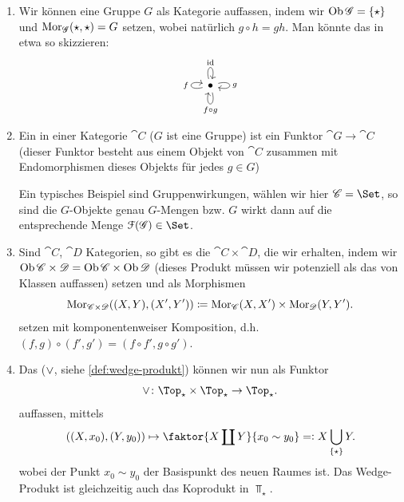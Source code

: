 \begin{example}
    \begin{enumerate}[1)]
        \item Wir können eine Gruppe $G$ als Kategorie auffassen, indem wir  $\operatorname{Ob}{\mathscr{G}} = \left \{\star\right\} $ und $\operatorname{Mor}_{\mathscr{G}}(\star,\star) = G$ setzen, wobei natürlich $g \circ  h = gh$. Man könnte das in etwa so skizzieren:
            \[
\begin{tikzcd}
            \bullet \ar[loop left]{}{f} \ar[loop above]{}{\id} \ar[loop right]{}{g} \ar[loop below]{}{f \circ g}
\end{tikzcd}
\]
\item Ein  in einer Kategorie $\cat{C}$ ($G$ ist eine Gruppe) ist ein Funktor  $\cat{G} \to  \cat{C}$ (dieser Funktor besteht aus einem Objekt von $\cat{C}$ zusammen mit Endomorphismen dieses Objekts für jedes $g\in G$)
    \begin{remark*}
        Ein typisches Beispiel sind Gruppenwirkungen, wählen wir hier $\cat{C} = \Set$, so sind die $G$-Objekte genau  $G$-Mengen bzw.  $G$ wirkt dann auf die entsprechende Menge  $\mathcal{F}(\cat{G})\in \Set$.
    \end{remark*}
\item Sind $\cat{C}$, $\cat{D}$ Kategorien, so gibt es die  $\cat{C} \times  \cat{D}$, die wir erhalten, indem wir $\operatorname{Ob}{\mathscr{C} \times \mathscr{D}} = \operatorname{Ob}{\mathscr{C}} \times \operatorname{Ob}{\mathscr{D}} $ (dieses Produkt müssen wir potenziell als das von Klassen auffassen) setzen und als Morphismen
    \[
        \operatorname{Mor}_{\mathscr{C}\times \mathscr{D}}((X,Y),(X',Y')) \coloneqq  \operatorname{Mor}_{\mathscr{C}}(X,X') \times \operatorname{Mor}_{\mathscr{D}}(Y,Y') 
    .\] 
    setzen mit komponentenweiser Komposition, d.h. $(f,g) \circ  (f', g') = (f \circ  f', g \circ  g')$.
\item Das  ($\vee$, siehe \autoref{def:wedge-produkt}) können wir nun als Funktor
     \[
    \twedge \colon \Top_{\star} \times \Top_{\star} \to  \Top_{\star}
    .\] 
    auffassen, mittels
    \[
        ((X,x_0),(Y,y_0)) \mapsto \faktor{X \coprod Y}{x_0 \sim  y_0} =\vcentcolon X \bigcup_{\left \{\star\right\} } Y 
    .\] 
    wobei der Punkt $x_0 \sim y_0$ der Basispunkt des neuen Raumes ist. Das Wedge-Produkt ist gleichzeitig auch das Koprodukt in $\Top_{\star}$.



\end{enumerate}
\end{example}
